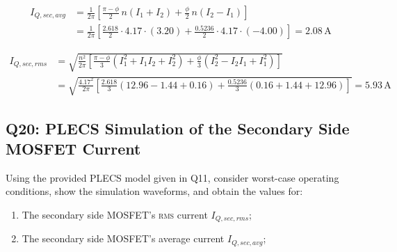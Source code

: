 \documentclass{PELsmallreport}
\begin{document}
\begin{framed}
\begin{align}
    I_{Q,sec,avg} &= \frac{1}{2\pi}\left[\frac{\pi - \phi}{2}\,n(I_1 + I_2) + \frac{\phi}{2}\,n(I_2 - I_1)\right] \nonumber \\
    &= \frac{1}{2\pi}\left[\frac{2.618}{2} \cdot 4.17 \cdot (3.20) + \frac{0.5236}{2} \cdot 4.17 \cdot (-4.00)\right] = 2.08\,\text{A}
\end{align}

\begin{align}
    I_{Q,sec,rms} &= \sqrt{\frac{n^2}{2\pi}\left[\frac{\pi - \phi}{3}(I_1^2 + I_1 I_2 + I_2^2) + \frac{\phi}{3}(I_2^2 - I_2 I_1 + I_1^2)\right]} \nonumber \\
    &= \sqrt{\frac{4.17^2}{2\pi}\left[\frac{2.618}{3}(12.96 - 1.44 + 0.16) + \frac{0.5236}{3}(0.16 + 1.44 + 12.96)\right]} = 5.93\,\text{A}
\end{align}
  \vspace{2em}
\end{framed}

 \quad
\hfill{}


\subsection{Q20: PLECS Simulation of the Secondary Side MOSFET Current} 
Using the provided PLECS model given in Q11, consider worst-case operating conditions, show the simulation waveforms, and obtain the values for: 
\begin{enumerate}[label=\alph*)]
    \item The secondary side MOSFET's \textsc{rms} current $I_{Q,sec,rms}$;
	\item The secondary side MOSFET's average current $I_{Q,sec,avg}$;
\end{enumerate}
\vspace{1cm}
\end{document}
